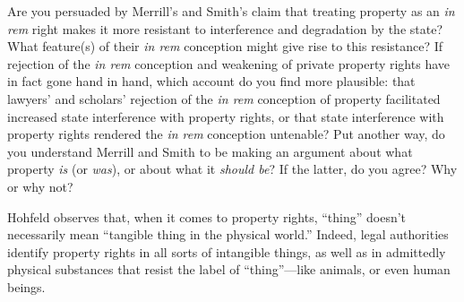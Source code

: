 \item Are you persuaded by Merrill's and Smith's claim that treating property as
an \textit{in rem} right makes it more resistant to interference and
degradation by the state? What feature(s) of their \textit{in rem} conception
might give rise to this resistance? If rejection of the \textit{in rem}
conception and weakening of private property rights have in fact gone hand in
hand, which account do you find more plausible: that lawyers' and scholars'
rejection of the \textit{in rem} conception of property facilitated increased
state interference with property rights, or that state interference with
property rights rendered the \textit{in rem} conception untenable? Put another
way, do you understand Merrill and Smith to be making an argument about what
property \textit{is} (or \textit{was}), or about what it \textit{should be}? If
the latter, do you agree? Why or why not?

\item Hohfeld observes that, when it comes to property rights, ``thing'' doesn't
necessarily mean ``tangible thing in the physical world.'' Indeed, legal
authorities identify property rights in all sorts of intangible things, as well
as in admittedly physical substances that resist the label of ``thing''---like
animals, or even human beings.

